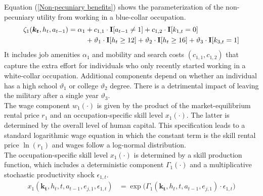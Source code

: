 \noindent Equation (\ref{Non-pecuniary benefits}) shows the parameterization of the non-pecuniary utility from working in a blue-collar occupation.
%
\begin{align}\label{Non-pecuniary benefits}
\zeta_{1}(\bm{k_t}, h_t, a_{t-1})  = \alpha_1  &+ c_{1,1} \cdot {\textbf{I}}[a_{t-1} \neq 1] + c_{1,2} \cdot {\textbf{I}}[k_{1,t} = 0] \\ \nonumber
                            & + \vartheta_1 \cdot {\textbf{I}}[h_t \geq 12] + \vartheta_2 \cdot {\textbf{I}}[h_t \geq 16] + \vartheta_3 \cdot {\textbf{I}}[k_{3,t} = 1]
\end{align}
%
It includes job amenities $\alpha_1$ and mobility and search costs $(c_{1,1}, c_{1,2})$ that capture the extra effort for individuals who only recently started working in a white-collar occupation. Additional components depend on whether an individual has a high school $\vartheta_1$ or college $\vartheta_2$ degree. There is a detrimental impact of leaving the military after a single year $\vartheta_3$.\\

\noindent The wage component $w_{1}(\cdot)$ is given by the product of the market-equilibrium rental price $r_{1}$ and an occupation-specific skill level $x_{1}(\cdot)$. The latter is determined by the overall level of human capital. This specification leads to a standard logarithmic wage equation in which the constant term is the skill rental price $\ln(r_{1})$ and wages follow a log-normal distribution.\\

\noindent The occupation-specific skill level $x_{1}(\cdot)$ is determined by a skill production function, which includes a deterministic component $\Gamma_1(\cdot)$ and a multiplicative stochastic productivity shock $\epsilon_{1,t}$.
%
\begin{align}
    x_{1}(\bm{k_t}, h_t, t, a_{t-1}, e_{j, 1}, \epsilon_{1,t}) & = \exp \big( \Gamma_{1}(\bm{k_t},  h_t, t, a_{t-1}, e_{j,1}) \cdot \epsilon_{1,t} \big) \nonumber
\end{align}

